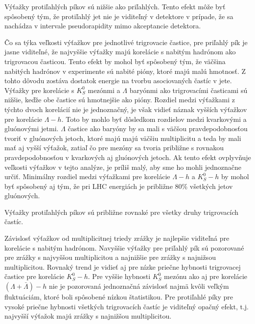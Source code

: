 \documentclass[thesismargins, thesislinespacing]{rnthesis}
\begin{document}
Výťažky protiľahlých píkov sú nižšie ako priľahlých. Tento efekt môže byť spôsobený tým, že protiľahlý jet nie je viditeľný v detektore v prípade, že sa nachádza v intervale pseudorapidity mimo akceptancie detektora. 

Čo sa týka veľkosti výťažkov pre jednotlivé trigrovacie častice, pre priľahlý pík je jasne viditeľné, že najvyššie výťažky majú korelácie s nabitým hadrónom ako trigrovacou časticou. Tento efekt by mohol byť spôsobený tým, že väčšina nabitých hadrónov v experimente sú nabité pióny, ktoré majú malú hmotnosť. Z tohto dôvodu zostáva dostatok energie na tvorbu asociovaných častíc v jete. Výťažky pre korelácie s $K^0_S$ mezónmi a $\Lambda$ baryónmi ako trigrovacími časticami sú nižšie, keďže obe častice sú hmotnejšie ako pióny. Rozdiel medzi výťažkami z týchto dvoch korelácií nie je jednoznačný, je však vidieť náznak vyšších výťažkov pre korelácie $\Lambda - h$. Toto by mohlo byť dôsledkom rozdielov medzi kvarkovými a gluónovými jetmi. $\Lambda$ častice ako baryóny by sa mali s väčšou pravdepodobnosťou tvoriť v gluónových jetoch, ktoré majú majú väčšiu multiplicitu a teda by mali mať aj vyšší výťažok, zatiaľ čo pre mezóny sa tvoria približne s rovnakou pravdepodobnosťou v kvarkových aj gluónových jetoch. Ak tento efekt ovplyvňuje veľkosti výťažkov v tejto analýze, je príliš malý, aby sme ho mohli jednoznačne určiť. Minimálny rozdiel medzi výťažkami pre korelácie  $\Lambda - h$ a $K^0_S-h$ by mohol byť spôsobený aj tým, že pri LHC energiách je približne 80\% všetkých jetov gluónových. 

Výťažky protiľahlých píkov sú približne rovnaké pre všetky druhy trigrovacích častíc.

Závislosť výťažkov od multiplicitnej triedy zrážky je najlepšie viditeľná pre korelácie s nabitým hadrónom. Navyššie výťažky pre priľahlý pík sú pozorované pre zrážky s najvyššou multiplicitou a najnižšie pre zrážky s najnižsou multiplicitou. Rovnaký trend je vidieť aj pre nízke priečne hybnosti trigrovacej častice pre korelácie  $K^0_S-h$. Pre vyššie hybnosti $K^{0}_{S}$ mezónu ako aj pre korelácie $(\Lambda+\bar{\Lambda}) -h$ nie je pozorovaná jednoznačná závislosť najmä kvôli veľkým fluktuáciám, ktoré boli spôsobené nízkou štatistikou. Pre protiľahlé píky pre vysoké priečne hybnosti všetkých trigrovacích častíc je viditeľný opačný efekt, t.j. najvyšší výťažok majú zrážky s najnižšou multiplicitou.  
  
\end{document}
